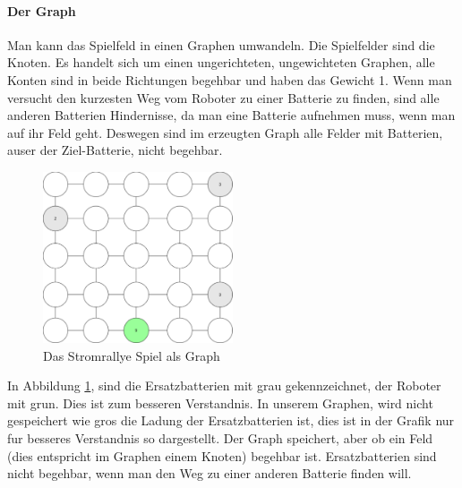 \documentclass[a4paper,12pt,arial]{scrartcl}
\begin{document}
\paragraph{Der Graph}
Man kann das Spielfeld in einen Graphen umwandeln. Die Spielfelder sind die Knoten.
Es handelt sich um einen ungerichteten, ungewichteten Graphen, alle Konten sind in beide Richtungen begehbar und haben das Gewicht 1.
Wenn man versucht den kurzesten Weg vom Roboter zu einer Batterie zu finden, sind alle anderen Batterien Hindernisse, da man eine Batterie aufnehmen muss, wenn man auf ihr Feld geht. Deswegen sind im erzeugten Graph alle Felder mit Batterien, auser der Ziel-Batterie, nicht begehbar.
\begin{figure}[h]
    \centering
    \includegraphics[width=0.5\textwidth]{graph_stromrallye.pdf}
    \caption{Das Stromrallye Spiel als Graph}
    \label{fig:graph_stromrallye}
\end{figure}
In Abbildung \ref{fig:graph_stromrallye}, sind die Ersatzbatterien mit grau gekennzeichnet, der Roboter mit grun.
Dies ist zum besseren Verstandnis.
In unserem Graphen, wird nicht gespeichert wie gros die Ladung der Ersatzbatterien ist, dies ist in der Grafik nur fur besseres Verstandnis so dargestellt.
Der Graph speichert, aber ob ein Feld (dies entspricht im Graphen einem Knoten) begehbar ist. Ersatzbatterien sind nicht begehbar, wenn man den Weg zu einer anderen Batterie finden will.

\newpage
\end{document}
